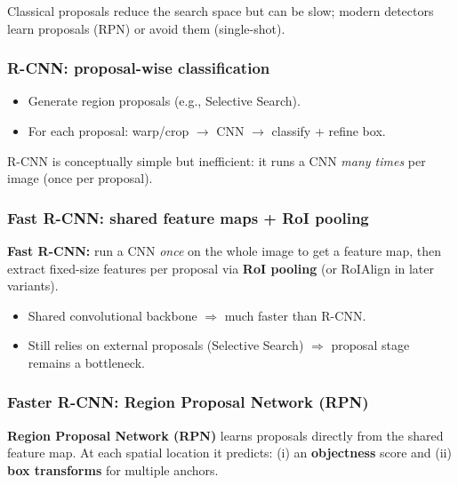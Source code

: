 \documentclass[11pt,a4paper]{article}
\begin{document}
\begin{notebox}
Classical proposals reduce the search space but can be slow; modern detectors learn proposals (RPN) or avoid them (single-shot).
\end{notebox}

\subsubsection{R-CNN: proposal-wise classification}

\begin{itemize}
  \item Generate region proposals (e.g., Selective Search).
  \item For each proposal: warp/crop $\rightarrow$ CNN $\rightarrow$ classify + refine box.
\end{itemize}

\begin{intbox}
R-CNN is conceptually simple but inefficient: it runs a CNN \emph{many times} per image (once per proposal).
\end{intbox}

\subsubsection{Fast R-CNN: shared feature maps + RoI pooling}

\begin{defbox}
\textbf{Fast R-CNN:} run a CNN \emph{once} on the whole image to get a feature map, then extract fixed-size features per proposal via
\textbf{RoI pooling} (or RoIAlign in later variants).
\end{defbox}

\begin{itemize}
  \item Shared convolutional backbone $\Rightarrow$ much faster than R-CNN.
  \item Still relies on external proposals (Selective Search) $\Rightarrow$ proposal stage remains a bottleneck.
\end{itemize}

\subsubsection{Faster R-CNN: Region Proposal Network (RPN)}

\begin{defbox}
\textbf{Region Proposal Network (RPN)} learns proposals directly from the shared feature map.
At each spatial location it predicts:
(i) an \textbf{objectness} score and (ii) \textbf{box transforms} for multiple anchors.
\end{defbox}
\end{document}
